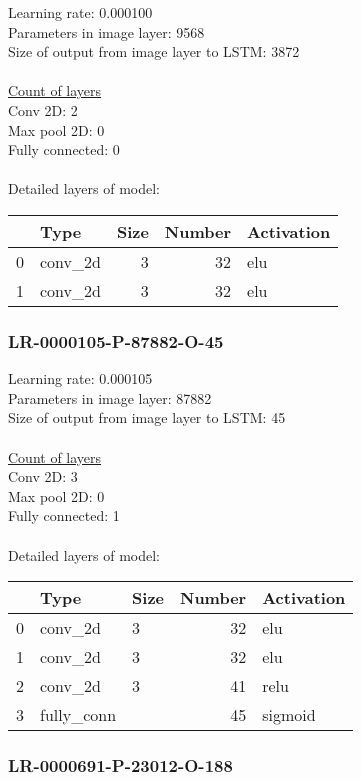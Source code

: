 Learning rate: 0.000100
\\Parameters in image layer: 9568
\\Size of output from image layer to LSTM: 3872
\\\\\underline{Count of layers} 
\\Conv 2D:           2\\Max pool 2D:      0\\Fully connected:  0
\\\\Detailed layers of model: \\\begin{tabular}{rlrrl}
\hline
    & Type    &   Size &   Number & Activation   \\
\hline
  0 & conv\_2d &      3 &       32 & elu          \\
  1 & conv\_2d &      3 &       32 & elu          \\
\hline
\end{tabular}\subsubsection*{LR-0000105-P-87882-O-45}
Learning rate: 0.000105
\\Parameters in image layer: 87882
\\Size of output from image layer to LSTM: 45
\\\\\underline{Count of layers} 
\\Conv 2D:           3\\Max pool 2D:      0\\Fully connected:  1
\\\\Detailed layers of model: \\\begin{tabular}{rllrl}
\hline
    & Type       & Size   &   Number & Activation   \\
\hline
  0 & conv\_2d    & 3      &       32 & elu          \\
  1 & conv\_2d    & 3      &       32 & elu          \\
  2 & conv\_2d    & 3      &       41 & relu         \\
  3 & fully\_conn &        &       45 & sigmoid      \\
\hline
\end{tabular}\subsubsection*{LR-0000691-P-23012-O-188}

